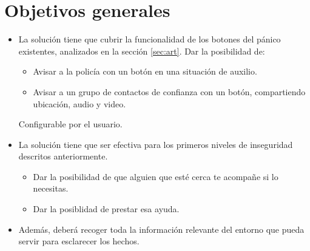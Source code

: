 \section{Objetivos generales}
\begin{itemize}
  \item La solución tiene que cubrir la funcionalidad de los botones del pánico existentes, analizados en la sección \ref{sec:art}.
  Dar la posibilidad de: 
  \begin{itemize}
    \item Avisar a la policía con un botón en una situación de auxilio.
    \item Avisar a un grupo de contactos de confianza con un botón, compartiendo ubicación, audio y video.
  \end{itemize}
  Configurable por el usuario.
  \item La solución tiene que ser efectiva para los primeros niveles de inseguridad descritos anteriormente.
  \begin{itemize}
    \item Dar la posibilidad de que alguien que esté cerca te acompañe si lo necesitas.
    \item Dar la posiblidad de prestar esa ayuda.
  \end{itemize}
  \item Además, deberá recoger toda la información relevante del entorno que pueda servir para esclarecer los hechos.
\end{itemize}
